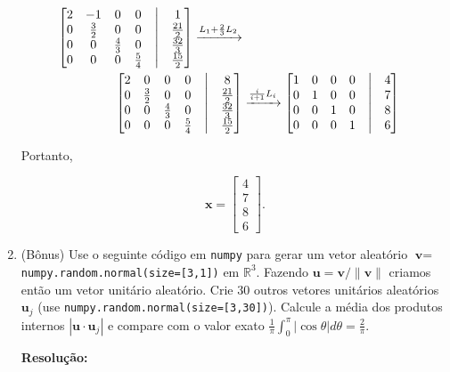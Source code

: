 \documentclass[leqno]{article}
\begin{document}
\begin{enumerate}
\begin{align*}
\begin{bmatrix}
    2 & -1 & 0 & 0 & \bigm| & 1\\
    0 & \frac{3}{2} & 0 & 0 & \bigm| & \frac{21}{2}\\
    0 & 0 & \frac{4}{3} & 0 & \bigm| & \frac{32}{3}\\
    0 & 0 & 0 & \frac{5}{4} & \bigm| & \frac{15}{2}\\
    \end{bmatrix}\xrightarrow{L_1+\frac{2}{3}L_2}\\
    \begin{bmatrix}
    2 & 0 & 0 & 0 & \bigm| & 8\\
    0 & \frac{3}{2} & 0 & 0 & \bigm| & \frac{21}{2}\\
    0 & 0 & \frac{4}{3} & 0 & \bigm| & \frac{32}{3}\\
    0 & 0 & 0 & \frac{5}{4} & \bigm| & \frac{15}{2}\\
    \end{bmatrix}&\xrightarrow{\frac{i}{i+1}L_i}\begin{bmatrix}
    1 & 0 & 0 & 0 & \bigm| & 4\\
    0 & 1 & 0 & 0 & \bigm| & 7\\
    0 & 0 & 1 & 0 & \bigm| & 8\\
    0 & 0 & 0 & 1 & \bigm| & 6\\
    \end{bmatrix}
    \end{align*}
    
    Portanto,
    
    $$\textbf{x}=\begin{bmatrix}
    4\\
    7\\
    8\\
    6
    \end{bmatrix}\text{.}$$
    
    \newpage
    
    \item (Bônus) Use o seguinte código em \texttt{numpy} para gerar um vetor aleatório $\textbf{v} =$ \texttt{numpy.random.normal(size=[3,1])} em $\mathbb{R}^3$. Fazendo $\textbf{u} = \textbf{v}/\lVert\textbf{v}\rVert$ criamos então um vetor unitário aleatório. Crie 30 outros vetores unitários aleatórios $\textbf{u}_j$ (use \texttt{numpy.random.normal(size=[3,30])}). Calcule a média dos produtos internos $|\textbf{u} \cdot \textbf{u}_j|$ e compare com o valor exato $\frac{1}{\pi}\int_0^{\pi}|\cos\theta|d\theta=\frac{2}{\pi}$.
    
    \textbf{Resolução:}
    

\end{enumerate}
\end{document}
